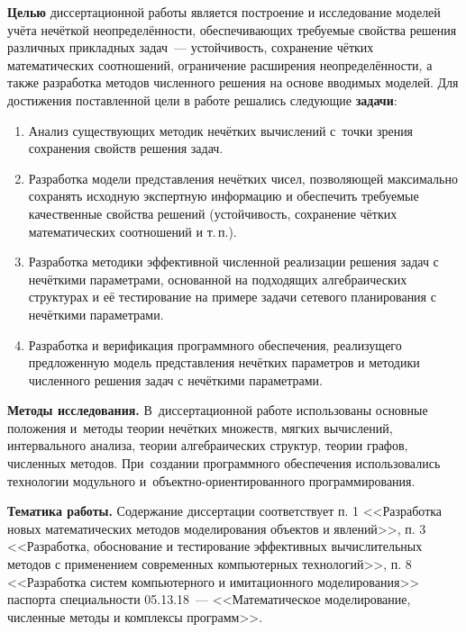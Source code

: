 \textbf{Целью} диссертационной работы является построение и исследование моделей учёта нечёткой неопределённости, обеспечивающих требуемые свойства решения различных прикладных задач~--- устойчивость, сохранение чётких математических соотношений, ограничение расширения неопределённости, а также разработка методов численного решения на основе вводимых моделей. Для достижения поставленной цели в работе решались следующие \textbf{задачи}:
\begin{enumerate}
  \item Анализ существующих методик нечётких вычислений с~точки зрения сохранения свойств решения задач.
  \item Разработка модели представления нечётких чисел, позволяющей максимально сохранять исходную экспертную информацию и обеспечить требуемые качественные свойства решений (устойчивость, сохранение чётких математических соотношений и т.\,п.).
  \item Разработка методики эффективной численной реализации решения задач с нечёткими параметрами, основанной на подходящих алгебраических структурах и её тестирование на примере задачи сетевого планирования с нечёткими параметрами.
  \item Разработка и верификация программного обеспечения, реализущего предложенную модель представления нечётких параметров и методики численного решения задач с нечёткими параметрами.
\end{enumerate}

\textbf{Методы исследования.} В~диссертационной работе использованы основные положения и~методы теории нечётких множеств, мягких вычислений, интервального анализа, теории алгебраических структур, теории графов, численных методов. При~создании программного обеспечения использовались технологии модульного и~объектно-ориентированного программирования.

\textbf{Тематика работы.} Содержание диссертации соответствует п. 1 <<Разработка новых математических методов моделирования объектов и явлений>>, п. 3 <<Разработка, обоснование и тестирование эффективных вычислительных методов с применением современных компьютерных технологий>>, п. 8 <<Разработка систем компьютерного и имитационного моделирования>> паспорта специальности 05.13.18~--- <<Математическое моделирование, численные методы и комплексы программ>>.

